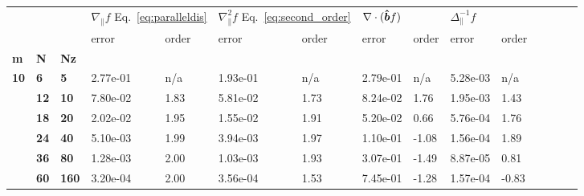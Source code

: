 \begin{tabular}{lllllllllllllll}
\toprule
  &     &     & \multicolumn{2}{l}{$\nabla_\parallel f$
  Eq.~\eqref{eq:paralleldis}} &
  \multicolumn{2}{l}{$\nabla_\parallel^2 f$ Eq.~\eqref{eq:second_order}} &
  \multicolumn{2}{l}{$\nabla\cdot(\bm{\hat{b}} f)$} &
  \multicolumn{2}{l}{$\Delta_\parallel^{-1}f $} \\
   &    &     &     error & order &     error & order &       error &  order &          error &  order \\
\textbf{m} & \textbf{N} & \textbf{Nz} &           &       &           &       &             &        &                &        \\
\midrule
\textbf{10} & \textbf{6 } & \textbf{5  } &  2.77e-01 &   n/a &  1.93e-01 &   n/a &    2.79e-01 &    n/a &       5.28e-03 &    n/a \\
            & \textbf{12} & \textbf{10 } &  7.80e-02 &  1.83 &  5.81e-02 &  1.73 &    8.24e-02 &   1.76 &       1.95e-03 &   1.43 \\
            & \textbf{18} & \textbf{20 } &  2.02e-02 &  1.95 &  1.55e-02 &  1.91 &    5.20e-02 &   0.66 &       5.76e-04 &   1.76 \\
            & \textbf{24} & \textbf{40 } &  5.10e-03 &  1.99 &  3.94e-03 &  1.97 &    1.10e-01 &  -1.08 &       1.56e-04 &   1.89 \\
            & \textbf{36} & \textbf{80 } &  1.28e-03 &  2.00 &  1.03e-03 &  1.93 &    3.07e-01 &  -1.49 &       8.87e-05 &   0.81 \\
            & \textbf{60} & \textbf{160} &  3.20e-04 &  2.00 &  3.56e-04 &  1.53 &    7.45e-01 &  -1.28 &       1.57e-04 &  -0.83 \\
\bottomrule
\end{tabular}
